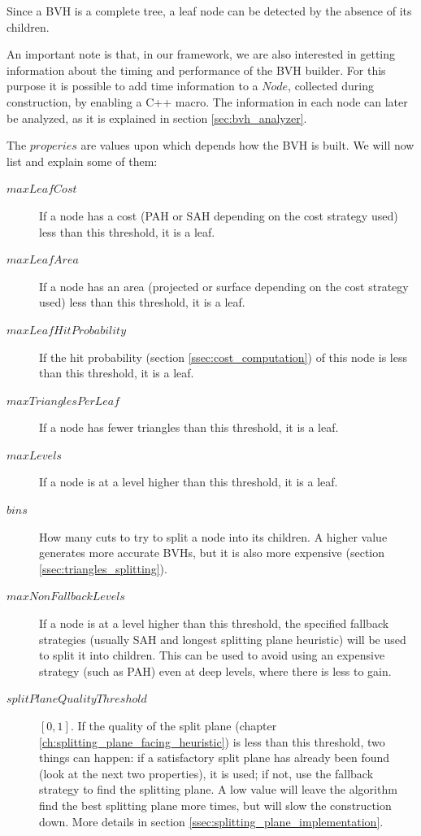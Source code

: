 \documentclass{PoliMi_MasterThesis}
\begin{document}
Since a BVH is a complete tree, a leaf node can be detected by the absence of its children.

An important note is that, in our framework, we are also interested in getting information about the timing and performance of the BVH builder. For this purpose it is possible to add time information to a $Node$, collected during construction, by enabling a C++ macro. The information in each node can later be analyzed, as it is explained in section \ref{sec:bvh_analyzer}.

The $properies$ are values upon which depends how the BVH is built. We will now list and explain some of them:
\begin{description} 
	\item[\boldmath$maxLeafCost$] If a node has a cost (PAH or SAH depending on the cost strategy used) less than this threshold, it is a leaf.
	\item[\boldmath$maxLeafArea$] If a node has an area (projected or surface depending on the cost strategy used) less than this threshold, it is a leaf.
	\item[\boldmath$maxLeafHitProbability$] If the hit probability (section \ref{ssec:cost_computation}) of this node is less than this threshold, it is a leaf.
	\item[\boldmath$maxTrianglesPerLeaf$] If a node has fewer triangles than this threshold, it is a leaf.
	\item[\boldmath$maxLevels$] If a node is at a level higher than this threshold, it is a leaf.
	\item[\boldmath$bins$] How many cuts to try to split a node into its children. A higher value generates more accurate BVHs, but it is also more expensive (section \ref{ssec:triangles_splitting}).
	\item[\boldmath$maxNonFallbackLevels$] If a node is at a level higher than this threshold, the specified fallback strategies (usually SAH and longest splitting plane heuristic) will be used to split it into children. This can be used to avoid using an expensive strategy (such as PAH) even at deep levels, where there is less to gain.
	\item[\boldmath$splitPlaneQualityThreshold$] $[0, 1]$. If the quality of the split plane (chapter \ref{ch:splitting_plane_facing_heuristic}) is less than this threshold, two things can happen: if a satisfactory split plane has already been found (look at the next two properties), it is used; if not, use the fallback strategy to find the splitting plane. A low value will leave the algorithm find the best splitting plane more times, but will slow the construction down. More details in section \ref{ssec:splitting_plane_implementation}.

\end{description}
\end{document}
